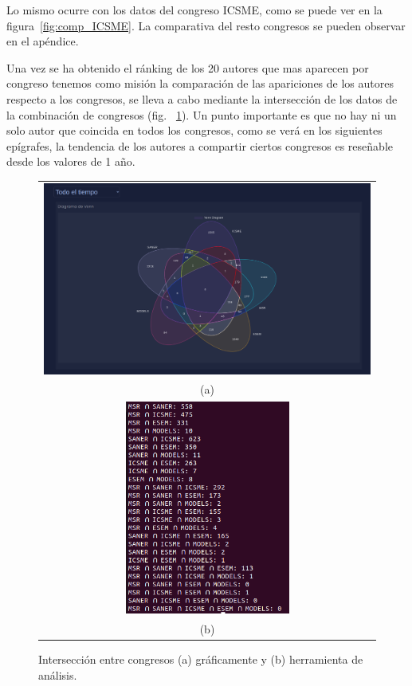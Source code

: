 \documentclass[a4paper, 12pt]{book}
\begin{document}
Lo mismo ocurre con los datos del congreso ICSME, como se puede ver en la figura~\ref{fig:comp_ICSME}. La comparativa del resto congresos se pueden observar en el apéndice.

Una vez se ha obtenido el ránking de los 20 autores que mas aparecen por congreso tenemos como misión la comparación de las apariciones de los autores respecto a los congresos, se lleva a cabo mediante la intersección de los datos de la combinación de congresos (fig. ~\ref{fig:comp_inter_all}). Un punto importante es que no hay ni un solo autor que coincida en todos los congresos, como se verá en los siguientes epígrafes, la tendencia de los autores a compartir ciertos congresos es reseñable desde los valores de 1 año.

\begin{figure}[!h]
    \centering
    \begin{tabular}{c}
    \includegraphics[width=1\textwidth]{img/venn_graph_T.png} \\
    (a) \\
    \includegraphics[width=0.5\textwidth]{img/inter_comp_all.png} \\
    (b)
    \end{tabular}
    \caption{Intersección entre congresos (a) gráficamente y (b) herramienta de análisis.}
    \label{fig:comp_inter_all}
\end{figure}
\end{document}
